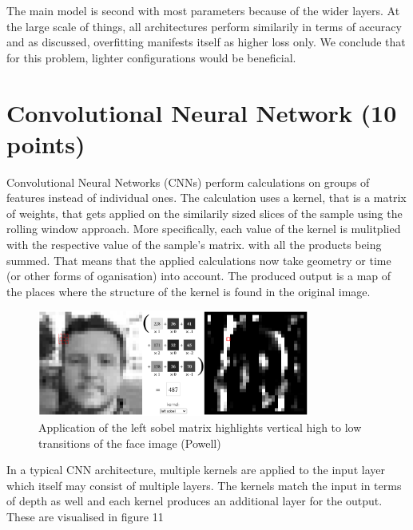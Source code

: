 \documentclass{article}
\begin{document}
The main model is second with most parameters because of the wider layers.
At the large scale of things, all architectures perform similarily in terms of accuracy and as discussed, overfitting manifests itself as higher loss only.
We conclude that for this problem, lighter configurations would be beneficial.

\section{Convolutional Neural Network (10 points)}

Convolutional Neural Networks (CNNs) perform calculations on groups of features instead of individual ones.
The calculation uses a kernel, that is a matrix of weights, that gets applied on the similarily sized slices of the sample using the rolling window approach.
More specifically, each value of the kernel is mulitplied with the respective value of the sample's matrix. with all the products being summed.
That means that the applied calculations now take geometry or time (or other forms of oganisation) into account.
The produced output is a map of the places where the structure of the kernel is found in the original image.

\begin{figure}[h!]
    \centering
    \includegraphics[width=0.8\textwidth]{./plots/screenshot9.png}  %
    \caption{Application of the left sobel matrix highlights vertical high to low transitions of the face image (Powell)}
    \label{fig:plot12}  %
\end{figure}

In a typical CNN architecture, multiple kernels are applied to the input layer which itself may consist of multiple layers.
The kernels match the input in terms of depth as well and each kernel produces an additional layer for the output. These are visualised in figure 11
\end{document}
